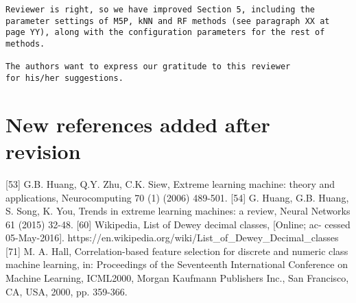 \documentclass[preprint]{elsarticle}
\begin{document}
\begin{verbatim}
Reviewer is right, so we have improved Section 5, including the 
parameter settings of M5P, kNN and RF methods (see paragraph XX at 
page YY), along with the configuration parameters for the rest of 
methods.

The authors want to express our gratitude to this reviewer 
for his/her suggestions.
\end{verbatim}



\section{New references added after revision}

[53] G.B. Huang, Q.Y. Zhu, C.K. Siew, Extreme learning machine: theory and applications, Neurocomputing 70 (1) (2006) 489-501.
[54] G. Huang, G.B. Huang, S. Song, K. You, Trends in extreme learning machines: a review, Neural Networks 61 (2015) 32-48.
[60] Wikipedia, List of Dewey decimal classes, [Online; ac- cessed 05-May-2016]. https://en.wikipedia.org/wiki/List\_of\_Dewey\_Decimal\_classes
[71] M. A. Hall, Correlation-based feature selection for discrete and numeric class machine learning, in: Proceedings of the Seventeenth International Conference on Machine Learning, ICML2000, Morgan Kaufmann Publishers Inc., San Francisco, CA, USA, 2000, pp. 359-366.
\end{document}
